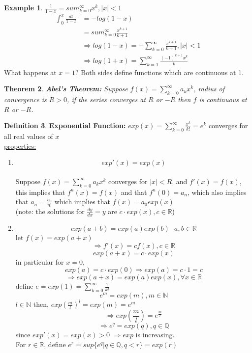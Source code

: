 \documentclass[12pt]{article}
\theoremstyle{plain}
\newtheorem{theorem}{Theorem}[section]
\theoremstyle{definition}
\newtheorem{definition}[theorem]{Definition}
\newtheorem{example}[theorem]{Example}
\begin{document}
\begin{example}
	$\frac{1}{1-x} = sum^\infty_{k=0} x^k, |x| < 1$
	\begin{align*}
		\int^x_0 \frac{dt}{1-t} &= -log(1-x)\\
		&= sum^\infty_{k=0} \frac{x^{k+1}}{k+1} \\
		&\Longrightarrow log(1-x) = - \sum^\infty_{k=0} \frac{x^{k+1}}{k+1}, |x| <1\\
		&\Longrightarrow log(1+x) = \sum^\infty_{k=1} \frac{(-1)^{k+1} x^k}{k}
	\end{align*}
	What happens at $x=1$? Both sides define functions which are continuous at 1.
\end{example}

\begin{theorem}
	\textbf{Abel's Theorem:} Suppose $f(x) = \sum^\infty_{k=0} a_k x^k$, radius of convergence is $R > 0$, if the series converges at $R$ or $-R$ then $f$ is continuous at $R$ or $-R$.
\end{theorem}

\begin{definition}
	\textbf{Exponential Function:} $exp(x) = \sum^\infty_{k=0} \frac{x^k}{k!} = e^k$ converges for all real values of $x$\\
	\underline{properties:}
	\begin{enumerate}
		\item{$$exp ' (x) = exp(x)$$\\
		Suppose $f(x)=\sum^\infty_{k=0} a_k x^k$ converges for $|x| < R$, and $f'(x) = f(x)$, this implies that $f^n (x) = f(x)$ and that $f^n (0) = a_n$, which also implies that $a_n = \frac{a_0}{n!}$ which implies that $f(x) = a_0 exp(x)$\\
		(note: the solutions for $\frac{dy}{dx} = y$ are $c \cdot exp(x), c \in \mathbb{R}$) 
		}
		\item{
		$$exp(a+b) = exp(a)exp(b)\:\:\: a,b \in\mathbb{R}$$
		let $f(x)=exp(a+x)$
		$$\Longrightarrow f'(x) = cf(x), c \in\mathbb{R}$$
		$$exp(a+x) = c \cdot exp(x)$$ in particular for $x=0$,
		$$exp(a) = c\cdot exp(0) \Longrightarrow exp(a) = c \cdot 1 = c$$
		$$\Longrightarrow exp(a+x) = exp(a) exp(x), \forall x \in\mathbb{R}$$
		define $e = exp(1)=\sum^\infty_{k=0} \frac{1}{k!}$
		$$e^m=exp(m),m\in\mathbb{N}$$
		$l\in\mathbb{N}$ then, $exp(\frac{m}{l})^l = exp(m) = e^m$
		$$\Longrightarrow exp(\frac{m}{l}) = e^{\frac{m}{l}}$$
		$$\Longrightarrow e^q = exp(q), q \in \mathbb{Q}$$
		since $exp'(x) = exp(x) > 0$ $\Longrightarrow exp$ is increasing.\\
		For $r\in\mathbb{R}$, define $e^r = sup \{ e^q | q\in\mathbb{Q}, q < r \} = exp(r)$
		}
	\end{enumerate}

\end{definition}
\end{document}
